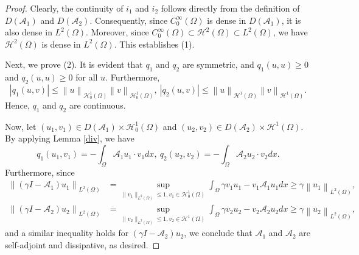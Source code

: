 \documentclass[9pt,reqno]{amsart}
\theoremstyle{plain}
\numberwithin{equation}{section}
\numberwithin{theorem}{section}
\def\Om{\Omega}
\def\Om{\Omega}
\def\mcH{\mathcal{H}}
\begin{document}
	\begin{proof}
		Clearly, the continuity of $i_1$ and $i_2$ follows directly from the definition of $D(\mathcal{A}_1)$ and $D(\mathcal{A}_2)$. Consequently, since $C_0^\infty (\Om)$ is dense in $D(\mathcal{A}_1)$, it is also dense in $L^2(\Om)$. Moreover, since $C_0^\infty (\Om)\subset \mathcal{H}^2(\Om)\subset L^2(\Om)$, we have $\mathcal{H}^2(\Om)$ is dense in $L^2(\Om)$. This establishes (1).
		
		Next, we prove (2). It is evident that $q_1$ and $q_2$ are symmetric, and $q_1(u,u) \ge 0$ and $q_2(u,u) \ge 0$ for all $u$. Furthermore,
		$$
		|q_1(u,v)|\le\left\| u\right\| _{\mcH_0^1(\Omega)} \left\| v\right\| _{\mcH_0^1(\Omega)},\ |q_2(u,v)|\le\left\| u\right\| _{\mcH^1(\Omega)} \left\| v\right\| _{\mcH^1(\Omega)}.
		$$
		Hence, $q_1$ and $q_2$ are continuous.
		
		Now, let $(u_1,v_1) \in D(\mathcal{A}_1)\times \mcH^1_0(\Omega)$ and $(u_2,v_2)\in D(\mathcal{A}_2)\times \mcH^1(\Omega)$. By applying Lemma \ref{div}, we have
		$$
		q_1(u_1,v_1)=-\int_{\Om}\mathcal{A}_1 u_1 \cdot v_1 d x, \ q_2(u_2,v_2)=-\int_{\Om}\mathcal{A}_2 u_2 \cdot v_2 d x.
		$$
		Furthermore, since
		$$
		\begin{aligned}
			\left\| (\gamma I - \mathcal{A}_1)u_1\right\| _{L^2(\Om)}
			&=\sup_{\|v_1\|_{L^2(\Om)} \le 1, v_1 \in \mcH_0^1(\Omega)} \int_{\Omega} \gamma v_1 u_1 - v_1 \mathcal{A}_1 u_1 dx
			\ge  \gamma \left\| u_1\right\| _{L^2(\Om)},\\
			\left\| (\gamma I - \mathcal{A}_2)u_2\right\| _{L^2(\Om)}
			&=\sup_{\|v_2\|_{L^2(\Om)} \le 1, v_2 \in \mcH^1(\Omega)} \int_{\Omega} \gamma v_2 u_2 - v_2 \mathcal{A}_2 u_2 dx
			\ge  \gamma \left\| u_2\right\| _{L^2(\Om)},
		\end{aligned}
		$$
		and a similar inequality holds for $(\gamma I - \mathcal{A}_2)u_2$, we conclude that $\mathcal{A}_1$ and $\mathcal{A}_2$ are self-adjoint and dissipative, as desired.
	\end{proof}
	
\end{document}
